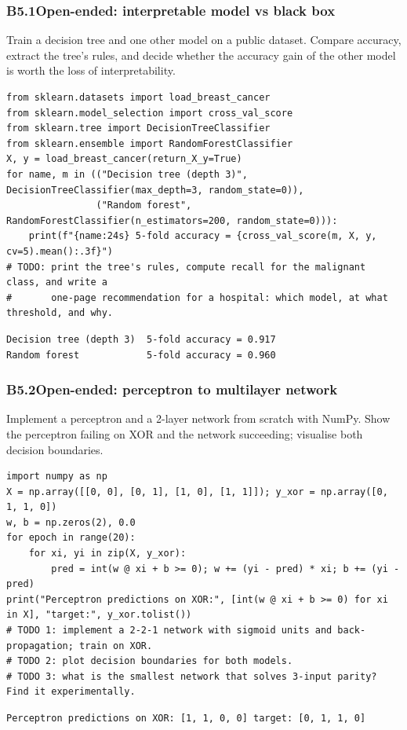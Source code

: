 \documentclass[11pt]{article}
\begin{document}
\subsubsection*{B5.1\quad Open-ended: interpretable model vs black box}
Train a decision tree and one other model on a public dataset. Compare accuracy, extract the tree's rules, and decide whether the accuracy gain of the other model is worth the loss of interpretability.
\begin{lstlisting}[style=py]
from sklearn.datasets import load_breast_cancer
from sklearn.model_selection import cross_val_score
from sklearn.tree import DecisionTreeClassifier
from sklearn.ensemble import RandomForestClassifier
X, y = load_breast_cancer(return_X_y=True)
for name, m in (("Decision tree (depth 3)", DecisionTreeClassifier(max_depth=3, random_state=0)),
                ("Random forest", RandomForestClassifier(n_estimators=200, random_state=0))):
    print(f"{name:24s} 5-fold accuracy = {cross_val_score(m, X, y, cv=5).mean():.3f}")
# TODO: print the tree's rules, compute recall for the malignant class, and write a
#       one-page recommendation for a hospital: which model, at what threshold, and why.
\end{lstlisting}
\begin{lstlisting}[style=out]
Decision tree (depth 3)  5-fold accuracy = 0.917
Random forest            5-fold accuracy = 0.960
\end{lstlisting}
\subsubsection*{B5.2\quad Open-ended: perceptron to multilayer network}
Implement a perceptron and a 2-layer network from scratch with NumPy. Show the perceptron failing on XOR and the network succeeding; visualise both decision boundaries.
\begin{lstlisting}[style=py]
import numpy as np
X = np.array([[0, 0], [0, 1], [1, 0], [1, 1]]); y_xor = np.array([0, 1, 1, 0])
w, b = np.zeros(2), 0.0
for epoch in range(20):
    for xi, yi in zip(X, y_xor):
        pred = int(w @ xi + b >= 0); w += (yi - pred) * xi; b += (yi - pred)
print("Perceptron predictions on XOR:", [int(w @ xi + b >= 0) for xi in X], "target:", y_xor.tolist())
# TODO 1: implement a 2-2-1 network with sigmoid units and back-propagation; train on XOR.
# TODO 2: plot decision boundaries for both models.
# TODO 3: what is the smallest network that solves 3-input parity? Find it experimentally.
\end{lstlisting}
\begin{lstlisting}[style=out]
Perceptron predictions on XOR: [1, 1, 0, 0] target: [0, 1, 1, 0]
\end{lstlisting}
\end{document}
